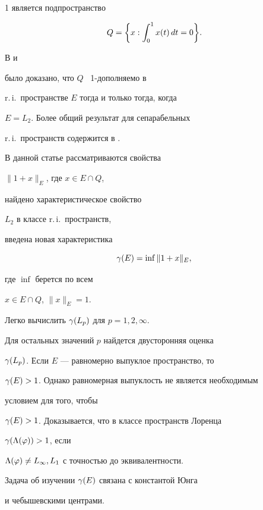 1 является подпространство 


\begin{equation}\label{e1}


Q = \bigg\{ x: \intl{0}{1} x(t)\, dt =0\bigg\}. 


\end{equation} 


В \cite{KR} и \cite{FS} 


было доказано, что $Q$ \ 1-дополняемо в 


r.\,i.\ пространстве $E$ тогда и только тогда, когда


$E=L_2$. Более общий результат для сепарабельных 


r.\,i.\ пространств содержится в \cite{KR}. 





В данной статье рассматриваются свойства 


$\|1 + x\|_E$, где $x\in E\cap Q$,


найдено характеристическое свойство 


$L_2$ в классе r.\,i.\ пространств,


введена новая характеристика


\begin{equation}\label{e2}


\gam(E) = \inf \|1 + x\|_E ,


\end{equation} 


где $\inf$ берется по всем 


$x\in E\cap Q$, $\|x\|_E = 1$. 


Легко вычислить $\gamma (L_p)$ для $p=1,2, \infty$. 


Для остальных значений $p$ найдется двусторонняя оценка


$\gamma (L_p)$. Если $E$ --- равномерно выпуклое пространство, то


$\gamma (E)>1$. Однако равномерная выпуклость не является необходимым 


условием для того, чтобы 


$\gamma (E) >1$. Доказывается, что в классе пространств Лоренца


$\gamma(\Lambda (\varphi))>1$, если


$\Lambda (\varphi) \ne L_\infty, L_1$ с точностью до эквивалентности.


Задача об изучении $\gamma (E)$ связана с константой Юнга 


\cite{SF} и чебышевскими центрами.





